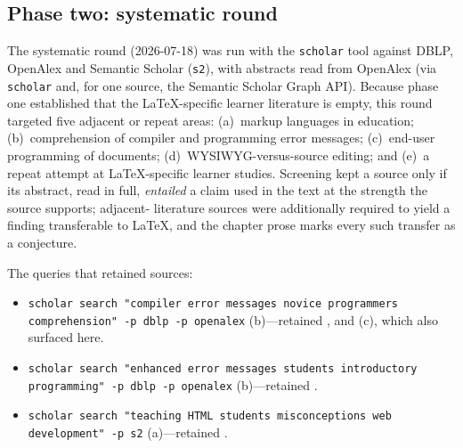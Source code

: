 \subsection{Phase two: systematic round}
\label{sec:phase-two}

The systematic round (2026-07-18) was run with the \texttt{scholar} tool
against DBLP, OpenAlex and Semantic Scholar (\texttt{s2}), with abstracts
read from OpenAlex (via \texttt{scholar} and, for one source, the Semantic
Scholar Graph API).
Because phase one established that the LaTeX-specific learner literature is
empty, this round targeted five adjacent or repeat areas:
(a)~markup languages in education;
(b)~comprehension of compiler and programming error messages;
(c)~end-user programming of documents;
(d)~WYSIWYG-versus-source editing; and
(e)~a repeat attempt at LaTeX-specific learner studies.
Screening kept a source only if its abstract, read in full, \emph{entailed}
a claim used in the text at the strength the source supports; adjacent-%
literature sources were additionally required to yield a finding
transferable to LaTeX, and the chapter prose marks every such transfer as a
conjecture.

The queries that retained sources:
\begin{itemize}
  \item \texttt{scholar search "compiler error messages novice programmers
    comprehension" -p dblp -p openalex} (b)---retained
    \autocite{Munson2016CompilerErrors,Traver2010CompilerErrors,%
    Prather2017Interaction}, and \autocite{Ko2004Barriers} (c), which also
    surfaced here.
  \item \texttt{scholar search "enhanced error messages students
    introductory programming" -p dblp -p openalex} (b)---retained
    \autocite{Becker2016CEM,Denny2021ErrorReadability}.
  \item \texttt{scholar search "teaching HTML students misconceptions web
    development" -p s2} (a)---retained \autocite{Kharchenko2025WebDesign}.
\end{itemize}

